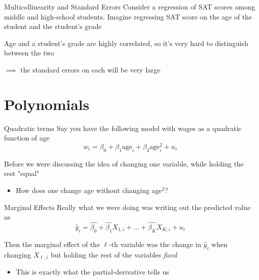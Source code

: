 \documentclass[aspectratio=169,t,11pt,table]{beamer}
\begin{document}
\begin{frame}{Multicollinearity and Standard Errors}
  Consider a regression of SAT scores among middle and high-school students. Imagine regressing SAT score on the age of the student and the student's grade

  \bigskip
  Age and a student's grade are highly correlated, so it's very hard to distinguish between the two 
  
  $\implies$ the standard errors on each will be very large
\end{frame}

% 
% 


\section{Polynomials}

\begin{frame}{Quadratic terms}
  Say you have the following model with wages as a quadratic function of age
  $$
    w_i = \beta_0 + \beta_1 \text{age}_i + \beta_2 \text{age}_i^2 + u_i
  $$

  \bigskip
  Before we were discussing the idea of changing one variable, while holding the rest "equal"
  \begin{itemize}
    \item How does one change age without changing age$^2$?
  \end{itemize}
\end{frame}

\begin{frame}{Marginal Effects}
  Really what we were doing was writing out the predicted value as 
  $$
    \hat{y}_i = \hat{\beta_0} + \hat{\beta_1} X_{1, i} + \dots + \hat{\beta_K} X_{K, i} + u_i
  $$

  Then the \alert{marginal effect} of the $\ell$-th variable was the change in $\hat{y}_i$ when changing $X_{\ell, i}$ but holding the rest of the variables \emph{fixed}
  \begin{itemize}
    \item This is exactly what the partial-derivative tells us
  \end{itemize}
\end{frame}
\end{document}
